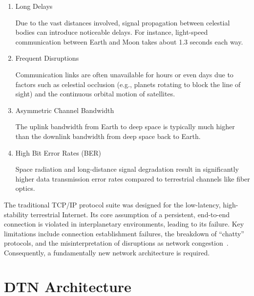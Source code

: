 \begin{enumerate}
  \item Long Delays
  
  Due to the vast distances involved, signal propagation between celestial bodies can introduce noticeable delays. For instance, light-speed communication between Earth and Moon takes about 1.3 seconds each way.

  \item Frequent Disruptions
  
  Communication links are often unavailable for hours or even days due to factors such as celestial occlusion (e.g., planets rotating to block the line of sight) and the continuous orbital motion of satellites.

  \item Asymmetric Channel Bandwidth
  
  The uplink bandwidth from Earth to deep space is typically much higher than the downlink bandwidth from deep space back to Earth.

  \item High Bit Error Rates (BER)
  
  Space radiation and long-distance signal degradation result in significantly higher data transmission error rates compared to terrestrial channels like fiber optics.
\end{enumerate}

The traditional TCP/IP protocol suite was designed for the low-latency, high-stability terrestrial Internet. Its core assumption of a persistent, end-to-end connection is violated in interplanetary environments, leading to its failure. Key limitations include connection establishment failures, the breakdown of ``chatty'' protocols, and the misinterpretation of disruptions as network congestion~\cite{sarkar2011survey}. Consequently, a fundamentally new network architecture is required.

\section{DTN Architecture}

